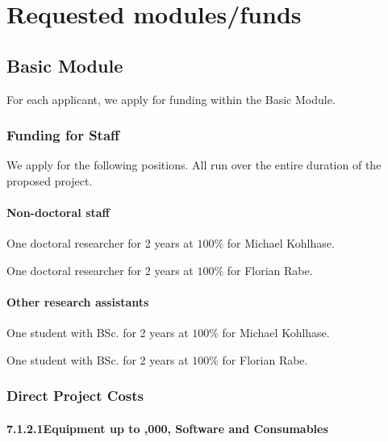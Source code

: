 \section{Requested modules/funds}

\subsection{Basic Module}

For each applicant, we apply for funding within the Basic Module.

\subsubsection{Funding for Staff}\label{sec:positions}
\label{sec:positions:research}

We apply for the following positions. All run over the entire duration of the proposed project.

\paragraph*{Non-doctoral staff}

One doctoral researcher for 2 years at $100 \%$ for Michael Kohlhase.

One doctoral researcher for 2 years at $100 \%$ for Florian Rabe.


\paragraph*{Other research assistants}

One student with BSc. for 2 years at $100 \%$ for Michael Kohlhase.

One student with BSc. for 2 years at $100 \%$ for Florian Rabe.

\subsubsection{Direct Project Costs}

\paragraph{7.1.2.1\quad Equipment up to ,000, Software and Consumables}

